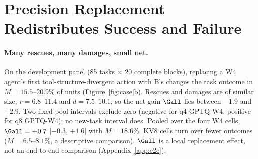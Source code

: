 \section{Precision Replacement Redistributes Success and Failure}
\label{sec:value}
\label{sec:r1}
\label{sec:r2}

\paragraph{Many rescues, many damages, small net.} On the \tautwo{} development panel (85 tasks $\times$ 20 complete blocks), replacing a W4 agent's first tool-structure-divergent action with B's changes the task outcome in $M=15.5$--$20.9$\% of units (Figure~\ref{fig:case}b). Rescues and damages are of similar size, $r=6.8$--$11.4$ and $d=7.5$--$10.1$\pp{}, so the net gain $\Gall$ lies between $-1.9$ and $+2.9$\pp{}. Two fixed-pool intervals exclude zero (negative for q4 GPTQ-W4, positive for q8 GPTQ-W4); no new-task interval does. Pooled over the four W4 cells, $\Gall=+0.7$ [$-0.3$, $+1.6$]\pp{} with $M=18.6$\%. KV8 cells turn over fewer outcomes ($M=6.5$--$8.1$\%, a descriptive comparison). %
$\Gall$ is a local replacement effect, not an end-to-end comparison (Appendix~\ref{app:e2e}).

